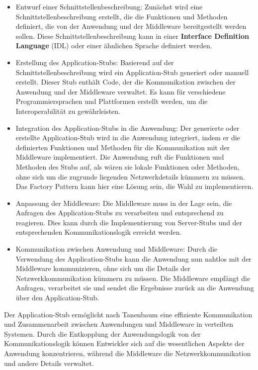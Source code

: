 \documentclass[../vs-script-first-v01.tex]{subfiles}
\begin{document}
\begin{itemize} 
\item Entwurf einer Schnittstellenbeschreibung: Zunächst wird eine Schnittstellenbeschreibung erstellt, die die Funktionen und Methoden definiert, die von der Anwendung und der Middleware bereitgestellt werden sollen. Diese Schnittstellenbeschreibung kann in einer \textbf{Interface Definition Language }(IDL) oder einer ähnlichen Sprache definiert werden.
\item Erstellung des Application-Stubs: Basierend auf der Schnittstellenbeschreibung wird ein Application-Stub generiert oder manuell erstellt. Dieser Stub enthält Code, der die Kommunikation zwischen der Anwendung und der Middleware verwaltet. Es kann für verschiedene Programmiersprachen und Plattformen erstellt werden, um die Interoperabilität zu gewährleisten.
\item Integration des Application-Stubs in die Anwendung: Der generierte oder erstellte Application-Stub wird in die Anwendung integriert, indem er die definierten Funktionen und Methoden für die Kommunikation mit der Middleware implementiert. Die Anwendung ruft die Funktionen und Methoden des Stubs auf, als wären sie lokale Funktionen oder Methoden, ohne sich um die zugrunde liegenden Netzwerkdetails kümmern zu müssen. Das Factory Pattern kann hier eine Lösung sein, die Wahl zu implementieren.
\item Anpassung der Middleware: Die Middleware muss in der Lage sein, die Anfragen des Application-Stubs zu verarbeiten und entsprechend zu reagieren. Dies kann durch die Implementierung von Server-Stubs und der entsprechenden Kommunikationslogik erreicht werden.
\item Kommunikation zwischen Anwendung und Middleware: Durch die Verwendung des Application-Stubs kann die Anwendung nun nahtlos mit der Middleware kommunizieren, ohne sich um die Details der Netzwerkkommunikation kümmern zu müssen. Die Middleware empfängt die Anfragen, verarbeitet sie und sendet die Ergebnisse zurück an die Anwendung über den Application-Stub.
\end{itemize} 
Der Application-Stub ermöglicht nach Tanenbaum eine effiziente Kommunikation und Zusammenarbeit zwischen Anwendungen und Middleware in verteilten Systemen. Durch die Entkopplung der Anwendungslogik von der Kommunikationslogik können Entwickler sich auf die wesentlichen Aspekte der Anwendung konzentrieren, während die Middleware die Netzwerkkommunikation und andere Details verwaltet.
\\\\
\end{document}

